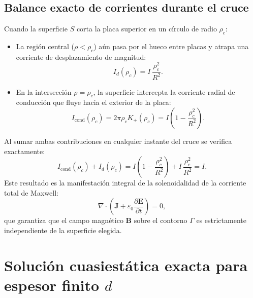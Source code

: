 \documentclass[11pt]{article}
\begin{document}
\subsection{Balance exacto de corrientes durante el cruce}

Cuando la superficie $S$ corta la placa superior en un círculo de radio $\rho_c$:
\begin{itemize}
    \item La región central ($\rho < \rho_c$) aún pasa por el hueco entre placas y atrapa una corriente de desplazamiento de magnitud:
    \begin{equation}
        I_d(\rho_c) = I\,\frac{\rho_c^2}{R^2}.
    \end{equation}
    \item En la intersección $\rho = \rho_c$, la superficie intercepta la corriente radial de conducción que fluye hacia el exterior de la placa:
    \begin{equation}
        I_{\mathrm{cond}}(\rho_c) = 2\pi \rho_c K_+(\rho_c) = I \left( 1 - \frac{\rho_c^2}{R^2} \right).
    \end{equation}
\end{itemize}

Al sumar ambas contribuciones en cualquier instante del cruce se verifica exactamente:
\begin{equation}
    I_{\mathrm{cond}}(\rho_c) + I_d(\rho_c) = I \left( 1 - \frac{\rho_c^2}{R^2} \right) + I\,\frac{\rho_c^2}{R^2} = I.
\end{equation}
Este resultado es la manifestación integral de la solenoidalidad de la corriente total de Maxwell:
\begin{equation}
    \nabla \cdot \left( \mathbf{J} + \varepsilon_0 \frac{\partial \mathbf{E}}{\partial t} \right) = 0,
\end{equation}
que garantiza que el campo magnético $\mathbf{B}$ sobre el contorno $\Gamma$ es estrictamente independiente de la superficie elegida.

\section{Solución cuasiestática exacta para espesor finito $d$}
\end{document}
